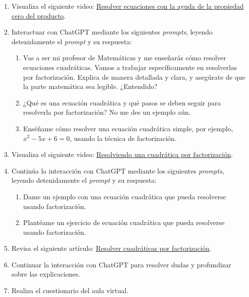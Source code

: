 \documentclass[a4,11pt]{aleph-notas}
\begin{document}
\begin{enumerate}[leftmargin=*,label=\arabic*.]
    \item Visualiza el siguiente video: \href{https://youtu.be/YGwoljiY68s}{Resolver ecuaciones con la ayuda de la propiedad cero del producto}.
    \item Interactuar con ChatGPT mediante los siguientes \textit{prompts}, leyendo detenidamente el \textit{prompt} y su respuesta:
    \begin{enumerate}[label=\textit{Prompt \arabic*.},leftmargin=2.1cm]
        \item Vas a ser mi profesor de Matemáticas y me enseñarás cómo resolver ecuaciones cuadráticas. Vamos a trabajar específicamente en resolverlas por factorización. Explica de manera detallada y clara, y asegúrate de que la parte matemática sea legible. ¿Entendido?
        \item ¿Qué es una ecuación cuadrática y qué pasos se deben seguir para resolverla por factorización? No me des un ejemplo aún.
        \item Enséñame cómo resolver una ecuación cuadrática simple, por ejemplo, $x^2 - 5x + 6 = 0$, usando la técnica de factorización.
    \end{enumerate}
    \item Visualiza el siguiente video: \href{https://www.youtube.com/watch?v=VB0yZ6fxQlU}{Resolviendo una cuadrática por factorización}.
    \item Continúa la interacción con ChatGPT mediante los siguientes \textit{prompts}, leyendo detenidamente el \textit{prompt} y su respuesta:
    \begin{enumerate}[label=\textit{Prompt \arabic*.},leftmargin=2.1cm,start=4]
        \item Dame un ejemplo con una ecuación cuadrática que pueda resolverse usando factorización.
        \item Plantéame un ejercicio de ecuación cuadrática que pueda resolverse usando factorización.
    \end{enumerate}
    \item Revisa el siguiente artículo: \href{https://es.khanacademy.org/math/algebra/x2f8bb11595b61c86:quadratic-functions-equations/x2f8bb11595b61c86:quadratics-solve-factoring/a/solving-quadratic-equations-by-factoring}{Resolver cuadráticas por factorización}.
    \item Continuar la interacción con ChatGPT para resolver dudas y profundizar sobre las explicaciones.
    \item Realiza el cuestionario del aula virtual.
\end{enumerate}
\end{document}
